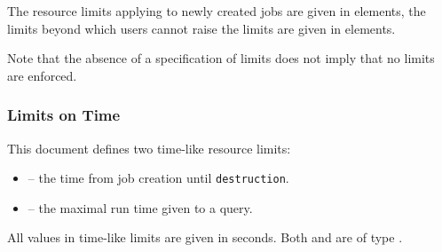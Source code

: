 \documentclass{ivoa}
\begin{document}
The resource limits applying to newly created jobs are given in
 elements, the limits beyond which users cannot
raise the limits are given in  elements.

Note that the absence of a specification of limits does not imply that
no limits are enforced.


\subsubsection{Limits on Time}
This document defines two time-like resource limits:


\begin{itemize}

\item {} -- the time from job creation until
		\texttt{destruction}.{}

\item {} -- the maximal run time given to
		a query.{}

\end{itemize}
All values in time-like limits are given in seconds.  Both
 and  are of type
.
\end{document}
